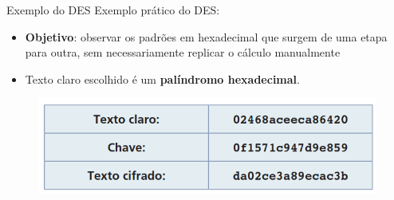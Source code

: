 \begin{frame}{Exemplo do DES}
    Exemplo prático do DES:

    \begin{itemize}
     \item \textbf{Objetivo}: observar os padrões em hexadecimal que surgem de uma etapa para outra, sem necessariamente replicar o cálculo manualmente
   
        \item Texto claro escolhido é um \textbf{palíndromo hexadecimal}.

    \end{itemize}

    \begin{figure}
        \centering
        \includegraphics[width=0.5\linewidth]{Figuras/palindromo-hexadecimal-des.png}
    \end{figure}
\end{frame}




